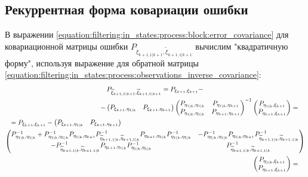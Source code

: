 \subsection{Рекуррентная форма ковариации ошибки}

В выражении \eqref{equation:filtering:in_states:process:block:error_covariance} для ковариационной матрицы ошибки
$P_{\widetilde{\xi}_{k+1,1|k+1}, \widetilde{\xi}_{k+1,1|k+1}}$ вычислим "квадратичную форму"{}, используя выражение для обратной матрицы
\eqref{equation:filtering:in_states:process:observations_inverse_covariance}:
\begin{multline*}
	P_{\widetilde{\xi}_{k+1,1|k+1}, \widetilde{\xi}_{k+1,1|k+1}}
		= P_{\xi_{k+1}, \xi_{k+1}} - \\
		\shoveright{
			-\begin{pmatrix} P_{\xi_{k+1}, \eta_{1|k}} & P_{\xi_{k+1}, \eta_{k+1}} \end{pmatrix}
			\begin{pmatrix}
				P_{\eta_{1|k}, \eta_{1|k}} & P_{\eta_{1|k}, \eta_{k+1}} \\
				P_{\eta_{1|k}, \eta_{1|k}} & P_{\eta_{k+1}, \eta_{k+1}}
			\end{pmatrix}^{-1}
			\begin{pmatrix}
				P_{\eta_{1|k}, \xi_{k+1}} \\
				P_{\eta_{k+1}, \xi_{k+1}}
			\end{pmatrix} =
		} \\
	\shoveleft{ = P_{\xi_{k+1}, \xi_{k+1}} - \begin{pmatrix} P_{\xi_{k+1}, \eta_{1|k}} & P_{\xi_{k+1}, \eta_{k+1}} \end{pmatrix} } \\
	\begin{pmatrix}
		P_{\eta_{1|k},\eta_{1|k}}^{-1} + P_{\eta_{1|k},\eta_{1|k}}^{-1} P_{\eta_{1|k}, \eta_{k+1}} P_{\widetilde{\eta}_{k+1, 1|k}, \widetilde{\eta}_{k+1, 1|k}}^{-1} P_{\eta_{k+1}, \eta_{1|k}} P_{\eta_{1|k},\eta_{1|k}}^{-1} & - P_{\eta_{1|k},\eta_{1|k}}^{-1} P_{\eta_{1|k}, \eta_{k+1}} P_{\widetilde{\eta}_{k+1, 1|k}, \widetilde{\eta}_{k+1, 1|k}}^{-1} \\
		- P_{\widetilde{\eta}_{k+1, 1|k}, \widetilde{\eta}_{k+1, 1|k}}^{-1} P_{\eta_{k+1}, \eta_{1|k}} P_{\eta_{1|k},\eta_{1|k}}^{-1}                                                                                          & P_{\widetilde{\eta}_{k+1, 1|k}, \widetilde{\eta}_{k+1, 1|k}}^{-1}
	\end{pmatrix} \\
	\shoveright{ \begin{pmatrix} P_{\eta_{1|k}, \xi_{k+1}} \\ P_{\eta_{k+1}, \xi_{k+1}} \end{pmatrix} = } \\

\end{multline*}
